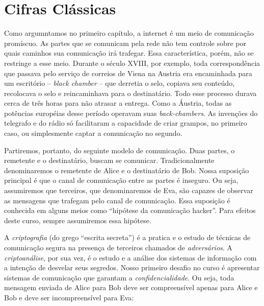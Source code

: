 \chapter{Cifras Clássicas}
\label{cha:cifras-classicas}

Como argumntamos no primeiro capítulo, a internet é um meio de comunicação promíscuo.
As partes que se comunicam pela rede não tem controle sobre por quais caminhos sua comunicação irá trafegar.
Essa característica, porém, não se restringe a esse meio.
Durante o século XVIII, por exemplo, toda correspondência que passava pelo serviço de correios de Viena na Austria era encaminhada para um escritório -- {\em black chamber} -- que derretia o selo, copiava seu conteúdo, recolocava o selo e reincaminhava para o destinatário.
Todo esse processo durava cerca de três horas para não atrasar a entrega.
Como a Áustria, todas as potências européias desse período operavam suas {\em back-chambers}.
As invenções do telegrafo e do rádio só facilitaram a capacidade de criar grampos, no primeiro caso, ou simplesmente captar a comunicação no segundo.

Partiremos, portanto, do seguinte modelo de comunicação.
Duas partes, o remetente e o destinatário, buscam se comunicar.
Tradicionalmente denominaremos o remetente de Alice e o destinatário de Bob.
Nossa suposição principal é que o canal de comunicação entre as partes é inseguro.
Ou seja, assumiremos que terceiros, que denominaremos de Eva, são capazes de observar as mensagens que trafegam pelo canal de comunicação.
Essa suposição é conhecida em alguns meios como ``hipótese da comunicação hacker''.
Para efeitos deste curso, sempre assumiremos essa hipótese.

A {\em criptografia} (do grego ``escrita secreta'') é a pratica e o estudo de técnicas de comunicação segura na presença de terceiros chamados de {\em adversários}.
A {\em criptoanálise}, por sua vez, é o estudo e a análise dos sistemas de informação com a intenção de desvelar seus segredos.
Nosso primeiro desafio no curso é apresentar sistemas de comunicação que garantam a {\em confidencialidade}.
Ou seja, toda mensagem enviada de Alice para Bob deve ser compreensível apenas para Alice e Bob e deve ser incompreensível para Eva:
\begin{center}
\end{center}

